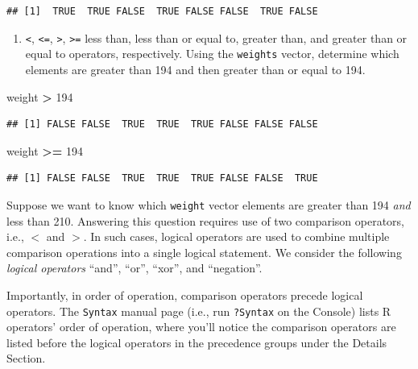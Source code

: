 \documentclass[
]{krantz}
\newenvironment{Shaded}{\begin{snugshade}}{\end{snugshade}}
\newcommand{\DecValTok}[1]{\textcolor[rgb]{0.00,0.00,0.81}{#1}}
\newcommand{\NormalTok}[1]{#1}
\newcommand{\OperatorTok}[1]{\textcolor[rgb]{0.81,0.36,0.00}{\textbf{#1}}}
\newcommand{\StringTok}[1]{\textcolor[rgb]{0.31,0.60,0.02}{#1}}
\providecommand{\tightlist}{%
  \setlength{\itemsep}{0pt}\setlength{\parskip}{0pt}}
\begin{document}
\begin{verbatim}
## [1]  TRUE  TRUE FALSE  TRUE FALSE FALSE  TRUE FALSE
\end{verbatim}

\begin{enumerate}
\def\labelenumi{\arabic{enumi}.}
\setcounter{enumi}{2}
\tightlist
\item
  \texttt{\textless{}}, \texttt{\textless{}=}, \texttt{\textgreater{}}, \texttt{\textgreater{}=} less than, less than or equal to, greater than, and greater than or equal to operators, respectively. Using the \texttt{weights} vector, determine which elements are greater than 194 and then greater than or equal to 194.
\end{enumerate}

\begin{Shaded}
\begin{Highlighting}[]
\NormalTok{weight }\OperatorTok{\textgreater{}}\StringTok{ }\DecValTok{194}
\end{Highlighting}
\end{Shaded}

\begin{verbatim}
## [1] FALSE FALSE  TRUE  TRUE  TRUE FALSE FALSE FALSE
\end{verbatim}

\begin{Shaded}
\begin{Highlighting}[]
\NormalTok{weight }\OperatorTok{\textgreater{}=}\StringTok{ }\DecValTok{194}
\end{Highlighting}
\end{Shaded}

\begin{verbatim}
## [1] FALSE FALSE  TRUE  TRUE  TRUE FALSE FALSE  TRUE
\end{verbatim}

Suppose we want to know which \texttt{weight} vector elements are greater than 194 \emph{and} less than 210. Answering this question requires use of two comparison operators, i.e., \(<\) and \(>\). In such cases, logical operators are used to combine multiple comparison operations into a single logical statement. We consider the following \emph{logical operators} ``and'', ``or'', ``xor'', and ``negation''.

Importantly, in order of operation, comparison operators precede logical operators. The \texttt{Syntax} manual page (i.e., run \texttt{?Syntax} on the Console) lists R operators' order of operation, where you'll notice the comparison operators are listed before the logical operators in the precedence groups under the Details Section.
\end{document}
